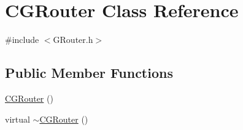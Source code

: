 \hypertarget{classCGRouter}{}\section{C\+G\+Router Class Reference}
\label{classCGRouter}


{\ttfamily \#include $<$G\+Router.\+h$>$}

\subsection*{Public Member Functions}
\begin{DoxyCompactItemize}
\item 
\mbox{\hyperlink{classCGRouter_a79a96199aa636d536a95118d05721b35}{C\+G\+Router}} ()
\item 
virtual \mbox{\hyperlink{classCGRouter_ab96e5ed8e11e1834c47fec6961f01c23}{$\sim$\+C\+G\+Router}} ()
\end{DoxyCompactItemize}
